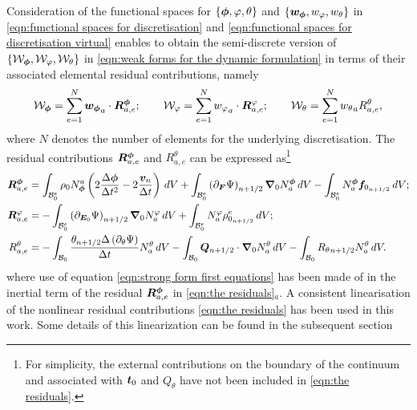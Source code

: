 Consideration of the functional spaces for $\{\boldsymbol{\phi},{\varphi},\theta\}$ and $\{\boldsymbol{w}_{\boldsymbol{\phi}},{w}_{{\varphi}},w_{\theta}\}$ in \eqref{eqn:functional spaces for discretisation} and \eqref{eqn:functional spaces for discretisation virtual} enables to obtain the semi-discrete version of $\{\mathcal{W}_{\boldsymbol{\phi}},\mathcal{W}_{{\varphi}},\mathcal{W}_{{\theta}}\}$ in \eqref{eqn:weak forms for the dynamic formulation} in terms of their associated elemental residual contributions, namely
%
\begin{equation}
\mathcal{W}_{\vect{\phi}} = \sum_{e=1}^N{\vect{w}_{\vect{\phi}}}_a\cdot\vect{R}_{a,e}^{\vect{\phi}};\qquad
%
\mathcal{W}_{{\varphi}} = \sum_{e=1}^N{{w}_{{\varphi}}}_a\cdot\vect{R}_{a,e}^{{\varphi}};\qquad
%
\mathcal{W}_{\theta} = \sum_{e=1}^N{w_{\theta}}_a{R}_{a,e}^{\theta},
\end{equation}
%
where $N$ denotes the number of elements for the underlying discretisation. 
The residual contributions $\boldsymbol{R}^{\boldsymbol{\phi}}_{a,e}$ and ${R}^{{\theta}}_{a,e}$ can be expressed as\footnote{For simplicity, the external contributions on the boundary of the continuum and associated with $\boldsymbol{t}_0$ and $Q_{\theta}$ have not been included in \eqref{eqn:the residuals}.}
%
\begin{equation}\label{eqn:the residuals}
\begin{aligned}
\vect{R}_{a,e}^{\vect{\phi}} & = \int_{\mathcal{B}^e_0}\rho_0N^a_{\vect{\phi}}\left(2\frac{\Delta\vect{\phi}}{\Delta t^2} - 2\frac{\vect{v}_n}{\Delta t}\right)\,dV + \int_{\mathcal{B}_0^e}\left(\partial_{\vect{F}}\Psi\right)_{n+1/2}\vect{\nabla}_0N^{\vect{\phi}}_a\,dV - \int_{\mathcal{B}_0^e}N^{\vect{\phi}}_{a}\vect{f}_{0_{n+1/2}}\,dV;\\
%
\vect{R}_{a,e}^{{\varphi}} & = -\int_{\mathcal{B}_0^e}\left(\partial_{\vect{E}_0}\Psi\right)_{n+1/2}\vect{\nabla}_0N^{{\varphi}}_a\,dV + \int_{\mathcal{B}_0^e}N^{{\varphi}}_{a}{\rho}^e_{0_{n+1/2}}\,dV;\\
%
R_{a,e}^{\theta} & =-\int_{\mathcal{B}_0}\frac{\theta_{n+1/2}\Delta\left(\partial_{\theta}\Psi\right)}{\Delta t}N^{\theta}_a\,dV - \int_{\mathcal{B}_0}\vect{Q}_{n+1/2}\cdot\vect{\nabla}_0N^{\theta}_a\,dV - \int_{\mathcal{B}_0}{R_{\theta}}_{n+1/2}N^{\theta}_a\,dV.
%
\end{aligned}
\end{equation}
%
where use of equation \eqref{eqn:strong form first equations} has been made of in the inertial term of the residual $\boldsymbol{R}^{\boldsymbol{\phi}}_{a,e}$ in \eqref{eqn:the residuals}$_a$. 
A consistent linearisation of the nonlinear residual contributions \eqref{eqn:the residuals} has been used in this work. Some details of this linearization can be found in the subsequent section

